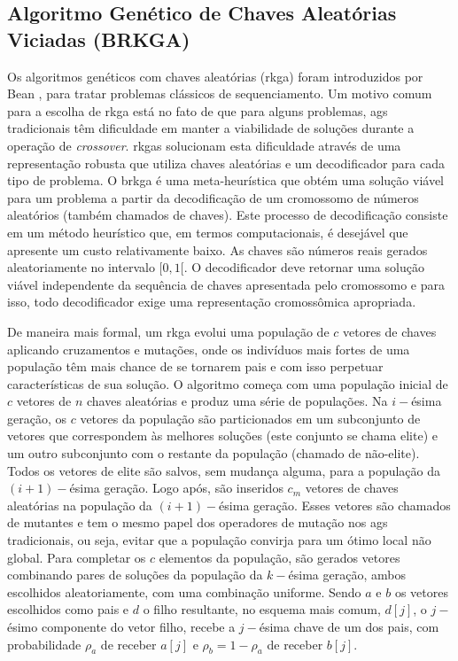 \subsection{Algoritmo Genético de Chaves Aleatórias Viciadas (BRKGA)} \label{subsec:brkga}

Os  algoritmos  genéticos  com chaves  aleatórias  (\gls{rkga})  foram
introduzidos por Bean \cite{bean1994}, para tratar problemas clássicos
de sequenciamento.  Um motivo comum  para a escolha de \gls{rkga} está
no  fato de  que  para alguns  problemas,  \gls{ag}s tradicionais  têm
dificuldade em manter a viabilidade  de soluções durante a operação de
\textit{crossover}.  \gls{rkga}s  solucionam esta  dificuldade através
de  uma  representação robusta  que  utiliza  chaves aleatórias  e  um
decodificador  para  cada  tipo  de problema.   O  \gls{brkga}  é  uma
meta-heurística que obtém uma solução viável para um problema a partir
da  decodificação  de  um  cromossomo de  números  aleatórios  (também
chamados de  chaves). Este  processo de  decodificação consiste  em um
método  heurístico  que, em  termos  computacionais,  é desejável  que
apresente um custo  relativamente baixo.  As chaves  são números reais
gerados aleatoriamente  no intervalo  $[0, 1[$.  O  decodificador deve
    retornar uma  solução viável  independente da sequência  de chaves
    apresentada pelo cromossomo e  para isso, todo decodificador exige
    uma representação cromossômica apropriada.

De  maneira mais  formal, um  \gls{rkga} evolui  uma população  de $c$
vetores de chaves aplicando cruzamentos e mutações, onde os indivíduos
mais fortes de uma população têm mais chance de se tornarem pais e com
isso perpetuar características de sua  solução. O algoritmo começa com
uma população inicial de $c$ vetores de $n$ chaves aleatórias e produz
uma  série de  populações. Na  $i-$ésima  geração, os  $c$ vetores  da
população  são   particionados  em  um  subconjunto   de  vetores  que
correspondem às melhores soluções (este  conjunto se chama elite) e um
outro   subconjunto  com   o   restante  da   população  (chamado   de
não-elite). Todos os vetores de  elite são salvos, sem mudança alguma,
para a população da $(i +  1)-$ésima geração. Logo após, são inseridos
$c_m$ vetores  de chaves  aleatórias na população  da $(i  + 1)-$ésima
geração. Esses  vetores são chamados de  mutantes e tem o  mesmo papel
dos operadores de mutação nos  \gls{ag}s tradicionais, ou seja, evitar
que  a  população convirja  para  um  ótimo  local não  global.   Para
completar  os   $c$  elementos  da  população,   são  gerados  vetores
combinando pares de soluções da  população da $k-$ésima geração, ambos
escolhidos aleatoriamente,  com uma  combinação uniforme. Sendo  $a$ e
$b$  os vetores  escolhidos como  pais e  $d$ o  filho resultante,  no
esquema mais  comum, $d[j]$,  o $j-$ésimo  componente do  vetor filho,
recebe a $j-$ésima chave de um dos pais, com probabilidade $\rho_a$ de
receber $a[j]$ e $\rho_b = 1 - \rho_a$ de receber $b[j]$.

